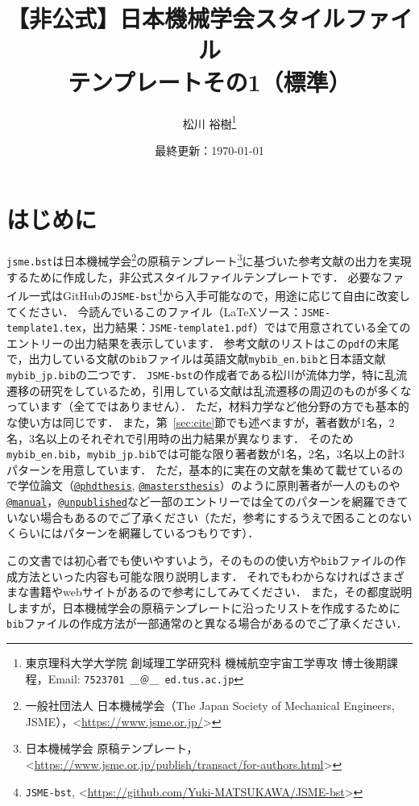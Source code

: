 \documentclass[a4paper,fleqn,uplatex,dvipdfmx]{jsarticle}
\title{【非公式】日本機械学会\BibTeX{}スタイルファイル \\ \JSMErepos テンプレートその1（標準）}
\author{松川 裕樹\thanks{東京理科大学大学院 創域理工学研究科 機械航空宇宙工学専攻 博士後期課程，Email: \texttt{7523701 ＿＠＿ ed.tus.ac.jp}}}
\date{最終更新：\today}
\makeatletter
\newcommand{\jsmefile}{\texttt{jsme.bst}}
\newcommand{\JSMErepos}{\texttt{JSME-bst}}
\newcommand{\ttmanual}{\texttt{@manual}}
\newcommand{\ttmastersthesis}{\texttt{@mastersthesis}}
\newcommand{\ttphdthesis}{\texttt{@phdthesis}}
\newcommand{\ttunpublished}{\texttt{@unpublished}}
\makeatother
\begin{document}
\maketitle
\thispagestyle{cover}

\vspace{-5mm}
\tableofcontents

\section{はじめに}
\label{sec:introduction}
\jsmefile は日本機械学会\footnote{一般社団法人 日本機械学会（The Japan Society of Mechanical Engineers, JSME），\textless\url{https://www.jsme.or.jp/}\textgreater}の原稿テンプレート\footnote{日本機械学会 原稿テンプレート，\textless\url{https://www.jsme.or.jp/publish/transact/for-authors.html}\textgreater}に基づいた参考文献の出力を実現するために作成した，非公式\BibTeX{}スタイルファイルテンプレートです．
必要なファイル一式はGitHubの\JSMErepos\footnote{\JSMErepos, \textless\url{https://github.com/Yuki-MATSUKAWA/JSME-bst}\textgreater}から入手可能なので，用途に応じて自由に改変してください．
今読んでいるこのファイル（\LaTeX{}ソース：\verb|JSME-template1.tex|，出力結果：\verb|JSME-template1.pdf|）では\BibTeX{}で用意されている全てのエントリーの出力結果を表示しています．
参考文献のリストはこの\verb|pdf|の末尾で，出力している文献の\verb|bib|ファイルは英語文献\verb|mybib_en.bib|と日本語文献\verb|mybib_jp.bib|の二つです．
\JSMErepos の作成者である松川が流体力学，特に乱流遷移の研究をしているため，引用している文献は乱流遷移の周辺のものが多くなっています（全てではありません）．
ただ，材料力学など他分野の方でも基本的な使い方は同じです．
また，第~\ref{sec:cite}節でも述べますが，著者数が1名，2名，3名以上のそれぞれで引用時の出力結果が異なります．
そのため\verb|mybib_en.bib|，\verb|mybib_jp.bib|では可能な限り著者数が1名，2名，3名以上の計3パターンを用意しています．
ただ，基本的に実在の文献を集めて載せているので学位論文（\hyperref[ssec:phdthesis]{\ttphdthesis}, \hyperref[ssec:mastersthesis]{\ttmastersthesis}）のように原則著者が一人のものや\hyperref[ssec:manual]{\ttmanual}，\hyperref[ssec:unpublished]{\ttunpublished}など一部のエントリーでは全てのパターンを網羅できていない場合もあるのでご了承ください（ただ，参考にするうえで困ることのないくらいにはパターンを網羅しているつもりです）．

この文書では\BibTeX{}初心者でも使いやすいよう，\BibTeX{}そのものの使い方や\verb|bib|ファイルの作成方法といった内容も可能な限り説明します．
それでもわからなければさまざまな書籍やwebサイトがあるので参考にしてみてください．
また，その都度説明しますが，日本機械学会の原稿テンプレートに沿ったリストを作成するために\verb|bib|ファイルの作成方法が一部通常の\BibTeX{}と異なる場合があるのでご了承ください．
\end{document}

